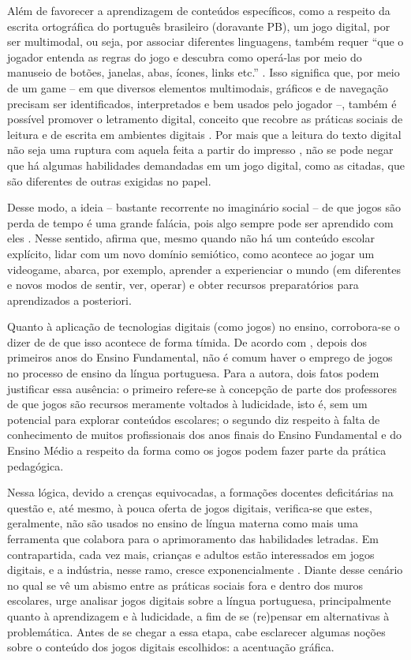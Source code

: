 \documentclass{textolivre}
\begin{document}
Além de favorecer a aprendizagem de conteúdos específicos, como a respeito da escrita ortográfica do português brasileiro (doravante PB), um jogo digital, por ser multimodal, ou seja, por associar diferentes linguagens, também requer “que o jogador entenda as regras do jogo e descubra como operá-las por meio do manuseio de botões, janelas, abas, ícones, links etc.” \cite[p. 166]{ribeiro2016}. Isso significa que, por meio de um game – em que diversos elementos multimodais, gráficos e de navegação precisam ser identificados, interpretados e bem usados pelo jogador –, também é possível promover o letramento digital, conceito que recobre as práticas sociais de leitura e de escrita em ambientes digitais \cite{ribeiro2014}. Por mais que a leitura do texto digital não seja uma ruptura com aquela feita a partir do impresso \cite{ribeiro2008}, não se pode negar que há algumas habilidades demandadas em um jogo digital, como as citadas, que são diferentes de outras exigidas no papel.

Desse modo, a ideia – bastante recorrente no imaginário social – de que jogos são perda de tempo é uma grande falácia, pois algo sempre pode ser aprendido com eles \cite{gee2004}. Nesse sentido, \textcite{gee2004} afirma que, mesmo quando não há um conteúdo escolar explícito, lidar com um novo domínio semiótico, como acontece ao jogar um videogame, abarca, por exemplo, aprender a experienciar o mundo (em diferentes e novos modos de sentir, ver, operar) e obter recursos preparatórios para aprendizados a posteriori.

Quanto à aplicação de tecnologias digitais (como jogos) no ensino, corrobora-se o dizer de \textcite{ribeiro2020} de que isso acontece de forma tímida. De acordo com \textcite{ribeiro2016}, depois dos primeiros anos do Ensino Fundamental, não é comum haver o emprego de jogos no processo de ensino da língua portuguesa. Para a autora, dois fatos podem justificar essa ausência: o primeiro refere-se à concepção de parte dos professores de que jogos são recursos meramente voltados à ludicidade, isto é, sem um potencial para explorar conteúdos escolares; o segundo diz respeito à falta de conhecimento de muitos profissionais dos anos finais do Ensino Fundamental e do Ensino Médio a respeito da forma como os jogos podem fazer parte da prática pedagógica.

Nessa lógica, devido a crenças equivocadas, a formações docentes deficitárias na questão e, até mesmo, à pouca oferta de jogos digitais, verifica-se que estes, geralmente, não são usados no ensino de língua materna como mais uma ferramenta que colabora para o aprimoramento das habilidades letradas. Em contrapartida, cada vez mais, crianças e adultos estão interessados em jogos digitais, e a indústria, nesse ramo, cresce exponencialmente \cite{ribeiro2016}. Diante desse cenário no qual se vê um abismo entre as práticas sociais fora e dentro dos muros escolares, urge analisar jogos digitais sobre a língua portuguesa, principalmente quanto à aprendizagem e à ludicidade, a fim de se (re)pensar em alternativas à problemática. Antes de se chegar a essa etapa, cabe esclarecer algumas noções sobre o conteúdo dos jogos digitais escolhidos: a acentuação gráfica.
\end{document}
